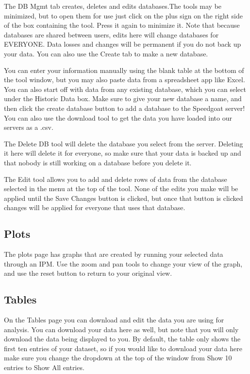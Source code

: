 \documentclass[
]{book}
\begin{document}
The DB Mgmt tab creates, deletes and edits databases.The tools may be minimized, but to open them for use just click on the plus sign on the right side of the box containing the tool. Press it again to minimize it. Note that because databases are shared between users, edits here will change databases for EVERYONE. Data losses and changes will be permanent if you do not back up your data. You can also use the Create tab to make a new database.

You can enter your information manually using the blank table at the bottom of the tool window, but you may also paste data from a spreadsheet app like Excel. You can also start off with data from any existing database, which you can select under the Historic Data box. Make sure to give your new database a name, and then click the create database button to add a database to the Speedgoat server! You can also use the download tool to get the data you have loaded into our servers as a .csv.

The Delete DB tool will delete the database you select from the server. Deleting it here will delete it for everyone, so make sure that your data is backed up and that nobody is still working on a database before you delete it.

The Edit tool allows you to add and delete rows of data from the database selected in the menu at the top of the tool. None of the edits you make will be applied until the Save Changes button is clicked, but once that button is clicked changes will be applied for everyone that uses that database.

\hypertarget{ipm-plot}{%
\subsection{Plots}\label{ipm-plot}}

The plots page has graphs that are created by running your selected data through an IPM. Use the zoom and pan tools to change your view of the graph, and use the reset button to return to your original view.

\hypertarget{ipm-table}{%
\subsection{Tables}\label{ipm-table}}

On the Tables page you can download and edit the data you are using for analysis. You can download your data here as well, but note that you will only download the data being displayed to you. By default, the table only shows the first ten entries of your dataset, so if you would like to download your data here make sure you change the dropdown at the top of the window from Show 10 entries to Show All entries.
\end{document}

